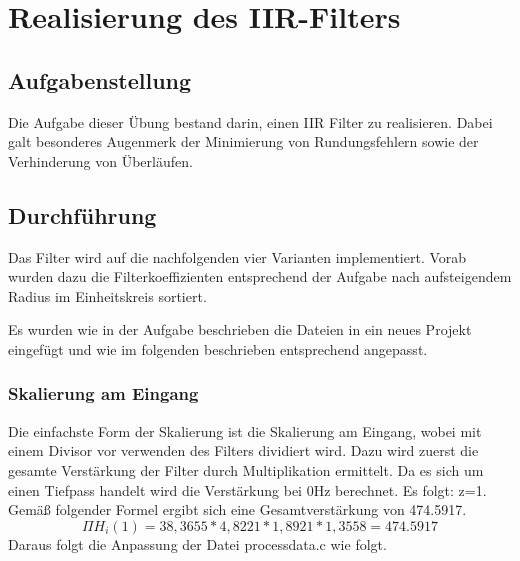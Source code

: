 \chapter{Realisierung des IIR-Filters}\label{Cha:RealIIR}
\section{Aufgabenstellung}
Die Aufgabe dieser Übung bestand darin, einen IIR Filter zu realisieren. Dabei galt besonderes Augenmerk der Minimierung von Rundungsfehlern sowie der Verhinderung von Überläufen.
\section{Durchf\"uhrung}
Das Filter wird auf die nachfolgenden vier Varianten implementiert. Vorab wurden dazu die Filterkoeffizienten entsprechend der Aufgabe nach aufsteigendem Radius im Einheitskreis sortiert.

Es wurden wie in der Aufgabe beschrieben die Dateien in ein neues Projekt eingefügt und wie im folgenden beschrieben entsprechend angepasst.
\subsection{Skalierung am Eingang}
Die einfachste Form der Skalierung ist die Skalierung am Eingang, wobei mit einem Divisor vor verwenden des Filters dividiert wird. Dazu wird zuerst die gesamte Verstärkung der Filter durch Multiplikation ermittelt.
Da es sich um einen Tiefpass handelt wird die Verstärkung bei 0Hz berechnet. Es folgt: z=1.
Gemäß folgender Formel ergibt sich eine Gesamtverstärkung von 474.5917.
\begin{equation}
\Pi H_i(1)=38,3655*4,8221*1,8921*1,3558=474.5917
\end{equation}
Daraus folgt die Anpassung der Datei process\textunderscore data.c wie folgt.\\

